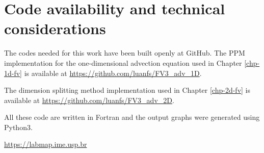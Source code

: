 \chapter{Code availability and technical considerations}
\label{anexo-code}

The codes needed for this work have been built openly at GitHub. 
The PPM implementation for the one-dimensional advection equation used in Chapter 
\ref{chp-1d-fv} is available at \url{https://github.com/luanfs/FV3_adv_1D}.

The dimension splitting method implementation used in Chapter 
\ref{chp-2d-fv} is available at \url{https://github.com/luanfs/FV3_adv_2D}.

All these code are written in Fortran and the output graphs were generated using Python3.

\url{https://labmap.ime.usp.br}

